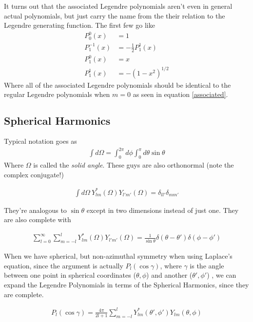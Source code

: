 It turns out that the associated Legendre polynomials aren't even in general actual polynomials, but just carry the name from the their relation to the Legendre generating function. The first few go like
\begin{align}
P_0^0(x) &= 1\\
P_1^{-1}(x) &= -\frac{1}{2}P_1^1(x)\\
P_1^0(x) &= x\\ 
P_1^1(x) &= -(1-x^2)^{1/2}
\end{align}
Where all of the associated Legendre polynomials should be identical to the regular Legendre polynomials when $m = 0$ as seen in equation \ref{associated}.



\subsection{Spherical Harmonics}


Typical notation goes as 
\begin{align}
\int d\Omega = \int_0^{2\pi} d\phi \int_0^\pi d\theta \sin\theta
\end{align}
Where $\Omega$ is called the \emph{solid angle}. These guys are also orthonormal (note the complex conjugate!)

\begin{align}
\int d\Omega~Y^*_{lm}(\Omega)Y_{l'm'}(\Omega) = \delta_{ll'}\delta_{mm'}
\end{align}

They're analogous to $\sin\theta$  except in two dimensions instead of just one. They are also complete with

\begin{align}
\sum_{l=0}^\infty \sum_{m=-l}^l Y^*_{lm}(\Omega)Y_{l'm'}(\Omega) = \frac{1}{\sin\theta}\delta(\theta-\theta')\delta(\phi-\phi')
\end{align}

When we have spherical, but non-azimuthal symmetry when using Laplace's equation, since the argument is actually $P_l(\cos\gamma)$, where $\gamma$ is the angle between one point in spherical coordinates ($\theta,\phi$) and another ($\theta',\phi'$) , we can expand the Legendre Polynomials in terms of the Spherical Harmonics, since they are complete.

\begin{align}
P_l(\cos\gamma) = \frac{4\pi}{2l+1}\sum_{m=-l}^l Y_{lm}^*(\theta', \phi')Y_{lm}(\theta,\phi)
\end{align}


